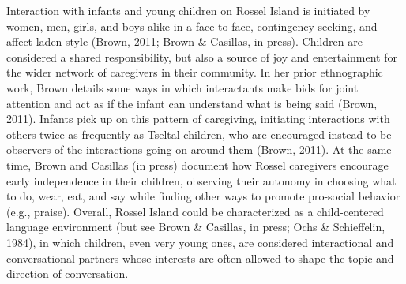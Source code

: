 \documentclass[,man,mask,floatsintext]{apa6}
\begin{document}
Interaction with infants and young children on Rossel Island is
initiated by women, men, girls, and boys alike in a face-to-face,
contingency-seeking, and affect-laden style (Brown, 2011; Brown \&
Casillas, in press). Children are considered a shared responsibility,
but also a source of joy and entertainment for the wider network of
caregivers in their community. In her prior ethnographic work, Brown
details some ways in which interactants make bids for joint attention
and act as if the infant can understand what is being said (Brown,
2011). Infants pick up on this pattern of caregiving, initiating
interactions with others twice as frequently as Tseltal children, who
are encouraged instead to be observers of the interactions going on
around them (Brown, 2011). At the same time, Brown and Casillas (in
press) document how Rossel caregivers encourage early independence in
their children, observing their autonomy in choosing what to do, wear,
eat, and say while finding other ways to promote pro-social behavior
(e.g., praise). Overall, Rossel Island could be characterized as a
child-centered language environment (but see Brown \& Casillas, in
press; Ochs \& Schieffelin, 1984), in which children, even very young
ones, are considered interactional and conversational partners whose
interests are often allowed to shape the topic and direction of
conversation.
\end{document}
